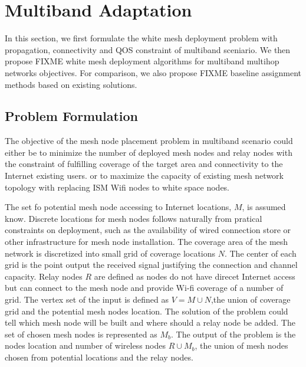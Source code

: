 \section{Multiband Adaptation}
\label{sec:model}

In this section, we first formulate the 
white mesh deployment problem
with propagation, connectivity and QOS constraint of multiband sceniario.
We then propose {FIXME} white mesh deployment algorithms for multiband multihop networks objectives.
For comparison, we also propose {FIXME} baseline assignment methods based on existing solutions.

\subsection{Problem Formulation}
The objective of the mesh node placement problem in multiband scenario could either be 
to minimize the number of deployed mesh nodes and relay nodes with the constraint of fulfilling coverage of the target area and connectivity to the Internet existing users. 
or to maximize the capacity of existing mesh network topology with replacing ISM Wifi nodes to white space nodes.

The set fo potential mesh node accessing to Internet locations, $M$, is assumed know. 
Discrete locations for mesh nodes follows naturally from pratical constraints on deployment, such as the availability of wired connection store or other infrastructure for mesh node installation.
The coverage area of the mesh network is discretized into small grid of coverage locations $N$. The center of each grid is the point output the received signal justifying the connection and channel capacity.
Relay nodes $R$  are defined as nodes do not have direcet Internet access but can connect to the mesh node and provide Wi-fi coverage of a number of grid.
The vertex set of the input is defined as $V=M\cup N$,the union of  coverage grid and the potential mesh nodes location. 
The solution of the problem could tell which mesh node will be built and where should a relay node be added. The set of chosen mesh nodes is represented as $M_b$. 
The output of the problem is the nodes location and number of wireless nodes $R\cup M_b$, the union of mesh nodes chosen from potential locations and the relay nodes. 


